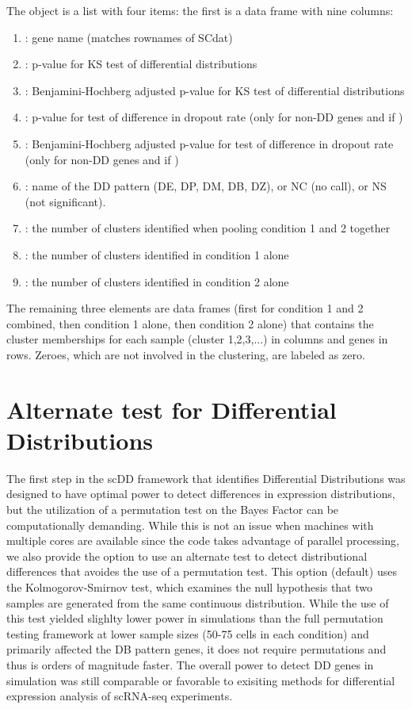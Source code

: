 \documentclass{article}\usepackage[]{graphicx}\usepackage[]{color}
\begin{document}
The  object is a list with four items: the first is a data frame with nine columns: 
\begin{enumerate}
  \item {}: gene name (matches rownames of SCdat)
  \item {}: p-value for KS test of differential distributions
  \item {}: Benjamini-Hochberg adjusted p-value for KS test of differential distributions
  \item {}: p-value for test of difference in dropout rate (only for non-DD genes and if )
  \item {}: Benjamini-Hochberg adjusted p-value for test of difference in dropout rate (only for non-DD genes and if )
  \item {}: name of the DD pattern (DE, DP, DM, DB, DZ), or NC (no call), or NS (not significant).  
  \item {}: the number of clusters identified when pooling condition 1 and 2 together
  \item {}: the number of clusters identified in condition 1 alone
  \item {}: the number of clusters identified in condition 2 alone
\end{enumerate}
  The remaining three elements are data frames (first for condition 1 and 2 combined, then condition 1 alone, then condition 2 alone) that contains the cluster memberships for each sample (cluster 1,2,3,...) in columns and genes in rows.  Zeroes, which are not involved in the clustering, are labeled as zero.  

\section{Alternate test for Differential Distributions}

The first step in the scDD framework that identifies Differential Distributions was designed to have optimal power to detect differences in expression distributions, but the utilization of a permutation test on the Bayes Factor can be computationally demanding.  While this is not an issue when machines with multiple cores are available since the code takes advantage of parallel processing, we also provide the option to use an alternate test to detect distributional differences that avoides the use of a permutation test.  This option (default) uses the Kolmogorov-Smirnov test, which examines the null hypothesis that two samples are generated from the same continuous distribution.  While the use of this test yielded slighlty lower power in simulations than the full permutation testing framework at lower sample sizes (50-75 cells in each condition) and primarily affected the DB pattern genes, it does not require permutations and thus is orders of magnitude faster.  The overall power to detect DD genes in simulation was still comparable or favorable to exisiting methods for differential expression analysis of scRNA-seq experiments. 
\end{document}
